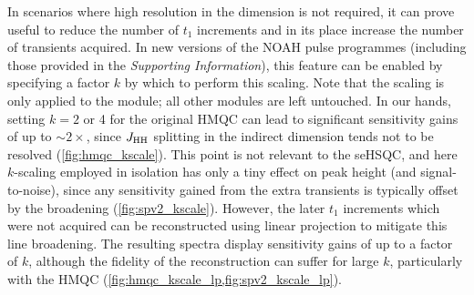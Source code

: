 \documentclass[11pt]{article}
\newcommand*{\nitrogen}{\ce{^{15}N}}
\newcommand*{\jhh}{J_{\ce{HH}}}
\newcommand*{\SInf}{\textit{Supporting Information}}
\begin{document}
In scenarios where high resolution in the \nitrogen{} dimension is not required, it can prove useful to reduce the number of $t_1$ increments and in its place increase the number of transients acquired.\autocite{Perez-Trujillo2007MRC, Parella2010CMR}
In new versions of the NOAH pulse programmes (including those provided in the \SInf{}), this feature can be enabled by specifying a factor $k$ by which to perform this scaling.
Note that the scaling is only applied to the \nitrogen{} module; all other modules are left untouched.
In our hands, setting $k = 2$ or 4 for the original \nitrogen{} HMQC can lead to significant sensitivity gains of up to $\sim 2\times$, since $\jhh$ splitting in the indirect dimension tends not to be resolved (\cref{fig:hmqc_kscale}).
This point is not relevant to the seHSQC, and here $k$-scaling employed in isolation has only a tiny effect on peak height (and signal-to-noise), since any sensitivity gained from the extra transients is typically offset by the broadening (\cref{fig:spv2_kscale}).
However, the later $t_1$ increments which were not acquired can be reconstructed using linear projection\autocite{linearpred} to mitigate this line broadening.
The resulting spectra display sensitivity gains of up to a factor of $k$, although the fidelity of the reconstruction can suffer for large $k$, particularly with the HMQC (\cref{fig:hmqc_kscale_lp,fig:spv2_kscale_lp}).


\end{document}
